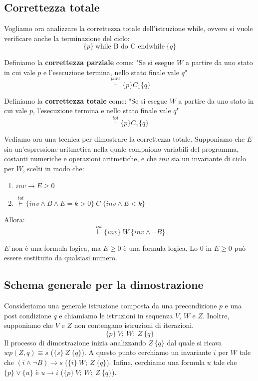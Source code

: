 \subsection{Correttezza totale}
Vogliamo ora analizzare la correttezza totale dell'istruzione while, ovvero si vuole verificare anche la terminazione del ciclo:
\begin{equation}
    \{p\} \ \text{while B do C endwhile} \ \{q\} 
\end{equation}
\begin{definizione}
    Definiamo la \textbf{correttezza parziale} come: "Se si esegue $W$ a partire da uno stato in cui vale $p$ e l'esecuzione termina, nello stato finale vale $q$" $$\stackrel{parz}{\vdash} \{p\} C_1 \{q\}$$
\end{definizione}
\begin{definizione}
    Definiamo la \textbf{correttezza totale} come: "Se si esegue $W$ a partire da uno stato in cui vale $p$, l'esecuzione termina e nello stato finale vale $q$" $$\stackrel{tot}{\vdash} \{p\} C_1 \{q\}$$
\end{definizione}
Vediamo ora una tecnica per dimostrare la correttezza totale. Supponiamo che $E$ sia un'espressione aritmetica nella quale compaiono variabili del programma, costanti numeriche e operazioni aritmetiche, e che $inv$ sia un invariante di ciclo per $W$, scelti in modo che:
\begin{enumerate}
    \item $inv \to E \geq 0$
    \item $\stackrel{tot}{\vdash} \{inv \land B \land E = k > 0\} \ C \ \{inv \land E < k\}$
\end{enumerate}
Allora:
\begin{equation}
    \stackrel{tot}{\vdash} \{inv\} \ W \ \{inv \land \lnot B\}
\end{equation}
\begin{nota}
    $E$ non è una formula logica, ma $E \geq 0$ è una formula logica. Lo $0$ in $E \geq 0$ può essere sostituito da qualsiasi numero.
\end{nota}
\subsection{Schema generale per la dimostrazione}
Consideriamo una generale istruzione composta da una precondizione $p$ e una post condizione $q$ e chiamiamo le istruzioni in sequenza $V$, $W$ e $Z$. Inoltre, supponiamo che $V$ e $Z$ non contengano istruzioni di iterazioni.$$\{p\} \ V; \ W; \ Z \ \{q\}$$ Il processo di dimostrazione inizia analizzando $Z \ \{q\}$ dal quale si ricava $wp(Z, q) \equiv s$ ($\{s\} \ Z \ \{q\}$). A questo punto cerchiamo un invariante $i$ per $W$ tale che $(i \land \lnot B) \to s$ ($\{i\} \ W; \ Z \ \{q\}$). Infine, cerchiamo una formula $u$ tale che $\{p\} \lor \{u\}$ è $u \to i$ ($\{p\} \ V; \ W; \ Z \ \{q\}$).
